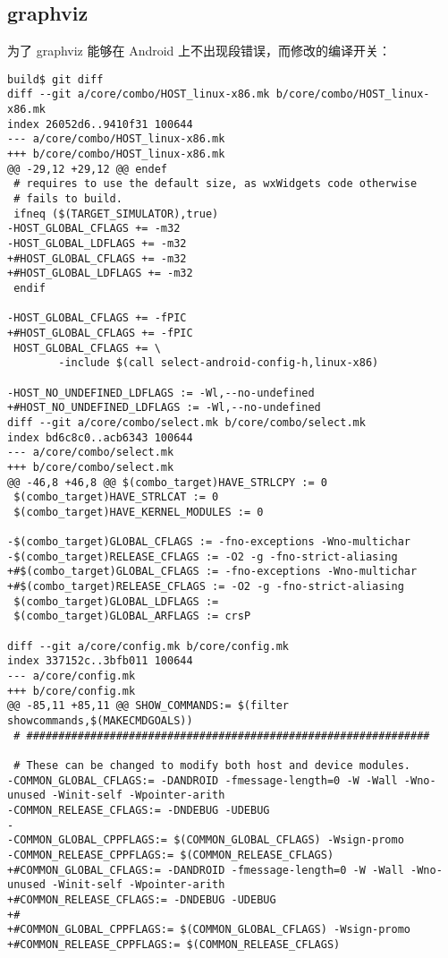 \documentclass[a4paper,titlepage]{article}
\begin{document}
\subsection{graphviz}
为了 graphviz 能够在 Android 上不出现段错误，而修改的编译开关：
\begin{Verbatim}[fontsize=\scriptsize]
build$ git diff
diff --git a/core/combo/HOST_linux-x86.mk b/core/combo/HOST_linux-x86.mk
index 26052d6..9410f31 100644
--- a/core/combo/HOST_linux-x86.mk
+++ b/core/combo/HOST_linux-x86.mk
@@ -29,12 +29,12 @@ endef
 # requires to use the default size, as wxWidgets code otherwise
 # fails to build.
 ifneq ($(TARGET_SIMULATOR),true)
-HOST_GLOBAL_CFLAGS += -m32
-HOST_GLOBAL_LDFLAGS += -m32
+#HOST_GLOBAL_CFLAGS += -m32
+#HOST_GLOBAL_LDFLAGS += -m32
 endif
 
-HOST_GLOBAL_CFLAGS += -fPIC
+#HOST_GLOBAL_CFLAGS += -fPIC
 HOST_GLOBAL_CFLAGS += \
        -include $(call select-android-config-h,linux-x86)
 
-HOST_NO_UNDEFINED_LDFLAGS := -Wl,--no-undefined
+#HOST_NO_UNDEFINED_LDFLAGS := -Wl,--no-undefined
diff --git a/core/combo/select.mk b/core/combo/select.mk
index bd6c8c0..acb6343 100644
--- a/core/combo/select.mk
+++ b/core/combo/select.mk
@@ -46,8 +46,8 @@ $(combo_target)HAVE_STRLCPY := 0
 $(combo_target)HAVE_STRLCAT := 0
 $(combo_target)HAVE_KERNEL_MODULES := 0
 
-$(combo_target)GLOBAL_CFLAGS := -fno-exceptions -Wno-multichar
-$(combo_target)RELEASE_CFLAGS := -O2 -g -fno-strict-aliasing
+#$(combo_target)GLOBAL_CFLAGS := -fno-exceptions -Wno-multichar
+#$(combo_target)RELEASE_CFLAGS := -O2 -g -fno-strict-aliasing
 $(combo_target)GLOBAL_LDFLAGS :=
 $(combo_target)GLOBAL_ARFLAGS := crsP
 
diff --git a/core/config.mk b/core/config.mk
index 337152c..3bfb011 100644
--- a/core/config.mk
+++ b/core/config.mk
@@ -85,11 +85,11 @@ SHOW_COMMANDS:= $(filter showcommands,$(MAKECMDGOALS))
 # ###############################################################
 
 # These can be changed to modify both host and device modules.
-COMMON_GLOBAL_CFLAGS:= -DANDROID -fmessage-length=0 -W -Wall -Wno-unused -Winit-self -Wpointer-arith
-COMMON_RELEASE_CFLAGS:= -DNDEBUG -UDEBUG
-
-COMMON_GLOBAL_CPPFLAGS:= $(COMMON_GLOBAL_CFLAGS) -Wsign-promo
-COMMON_RELEASE_CPPFLAGS:= $(COMMON_RELEASE_CFLAGS)
+#COMMON_GLOBAL_CFLAGS:= -DANDROID -fmessage-length=0 -W -Wall -Wno-unused -Winit-self -Wpointer-arith
+#COMMON_RELEASE_CFLAGS:= -DNDEBUG -UDEBUG
+#
+#COMMON_GLOBAL_CPPFLAGS:= $(COMMON_GLOBAL_CFLAGS) -Wsign-promo
+#COMMON_RELEASE_CPPFLAGS:= $(COMMON_RELEASE_CFLAGS)
 

\end{Verbatim}
\end{document}
